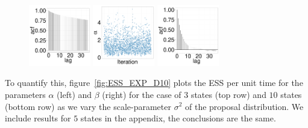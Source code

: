 \begin{figure}[H]
\begin{minipage}[!hp]{0.97\linewidth}
    \includegraphics [width=0.24\textwidth, angle=0]{figs/EXP_ks/exp_gbsacf_44_05_10_.pdf}
    \includegraphics [width=0.24\textwidth, angle=0]{figs/EXP_ks/exp_traceMH_44_05_10_.pdf}
    \includegraphics [width=0.24\textwidth, angle=0]{figs/EXP_ks/exp_mhacf_44_05_10_.pdf}
  \end{minipage}
  \end{figure}
To quantify this, figure~\ref{fig:ESS_EXP_D10} plots the ESS per unit time for the parameters $\alpha$ (left) and $\beta$ (right) for the case of $3$ states (top row) and $10$ states (bottom row) as we vary the scale-parameter $\sigma^2$ of the proposal distribution. 
We include results for $5$ states in the appendix, the conclusions are the same. 
